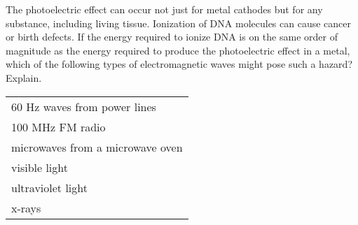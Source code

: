 The photoelectric effect can occur not just for metal
cathodes but for any substance, including living tissue. 
Ionization of DNA molecules can cause cancer or birth
defects. If the energy required to ionize DNA is on the same
order of magnitude as the energy required to produce the
photoelectric effect in a metal, which of the following types of
electromagnetic waves might pose such a hazard? Explain.

\begin{tabular}{l}
                60 Hz waves from power lines\\
                100 MHz FM radio\\
                microwaves from a microwave oven\\
                visible light\\
                ultraviolet light\\
                x-rays
\end{tabular}
